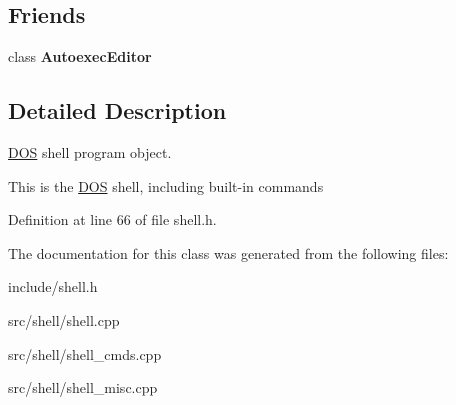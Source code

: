 \subsection*{Friends}
\begin{DoxyCompactItemize}
\item 
\hypertarget{classDOS__Shell_abca6adc7a2081b5b03c267fdae1d0b8d}{class {\bfseries Autoexec\-Editor}}\label{classDOS__Shell_abca6adc7a2081b5b03c267fdae1d0b8d}

\end{DoxyCompactItemize}


\subsection{Detailed Description}
\hyperlink{classDOS}{D\-O\-S} shell program object. 

This is the \hyperlink{classDOS}{D\-O\-S} shell, including built-\/in commands 

Definition at line 66 of file shell.\-h.



The documentation for this class was generated from the following files\-:\begin{DoxyCompactItemize}
\item 
include/shell.\-h\item 
src/shell/shell.\-cpp\item 
src/shell/shell\-\_\-cmds.\-cpp\item 
src/shell/shell\-\_\-misc.\-cpp\end{DoxyCompactItemize}
